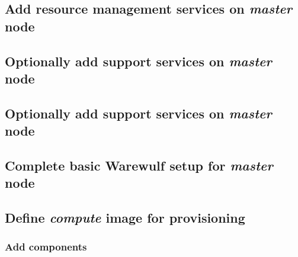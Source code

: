 \documentclass[letterpaper]{article}
\begin{document}
\clearpage
\subsection{Add resource management services on {\em master} node} \label{sec:add_rm}


\subsection{Optionally add \InfiniBand{} support services on {\em master} node} \label{sec:add_ofed}


\subsection{Optionally add \OmniPath{} support services on {\em master} node} \label{sec:add_opa}


\vspace*{.3cm}
\subsection{Complete basic Warewulf setup for {\em master} node} \label{sec:setup_ww}



\subsection{Define {\em compute} image for provisioning}


\subsubsection{Add \OHPC{} components} \label{sec:add_components}

\end{document}
